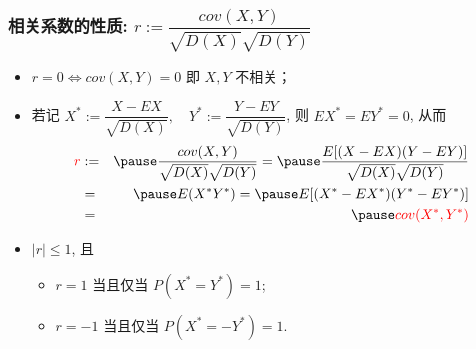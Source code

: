 \documentclass[Prob-All.tex]{subfiles}
\begin{document}
\begin{frame}
	\frametitle{相关系数的性质: $ r:=\dfrac{cov (X,Y)}{\sqrt{D (X)}\sqrt{D (Y)}}$}
	\begin{itemize}[<+-|alert@+>]
		\item $r=0\Leftrightarrow cov (X,Y)=0$ 即 $X,Y$ 不相关；
		\item 若记 $X^*:=\dfrac{X-EX}{\sqrt{D (X)}}, \quad Y^*:=\dfrac{Y-EY}{\sqrt{D (Y)}}$, 则 $EX^*=EY^*=0$, 从而
		\begin{eqnarray*}
			\textcolor{red}{r}&:=&\pause \dfrac{cov(X,Y)}{\sqrt{D(X)}\sqrt{D(Y)}}=\pause \dfrac{E[(X-EX)(Y-EY)]}{\sqrt{D(X)}\sqrt{D(Y)}}\\
			&=&\pause E(X^*Y^*)=\pause E[(X^*-EX^*)(Y^*-EY^*)]\\
			&=&\pause \textcolor{red}{cov(X^*,Y^*)}
		\end{eqnarray*}
		\item $|r|\le 1$, 且
		\begin{itemize}
			\item $r=1$ 当且仅当 $P (X^*=Y^*)=1$;
			\item $r=-1$ 当且仅当 $P (X^*=-Y^*)=1$.
		\end{itemize}
	\end{itemize}
\end{frame}
\end{document}
